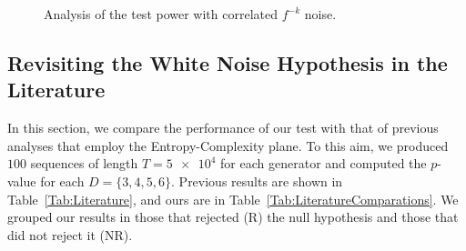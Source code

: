 \begin{figure}
	\centering
	\caption{Analysis of the test power with correlated $f^{-k}$ noise.}
	\label{fig:correlation}
\end{figure}

\subsection{Revisiting the White Noise Hypothesis in the Literature}

In this section, we compare the performance of our test with that of 
previous analyses that employ the Entropy-Complexity plane.
To this aim, we produced $100$ sequences of length $T = \num[scientific-notation=true]{5 e4}$ for each generator and computed the $p$-value for each $D = \{3, 4, 5, 6\}$.
Previous results are shown in Table~\ref{Tab:Literature}, and ours are in Table~\ref{Tab:LiteratureComparations}.
We grouped our results in those that rejected (R) the null hypothesis and those that did not reject it (NR).

